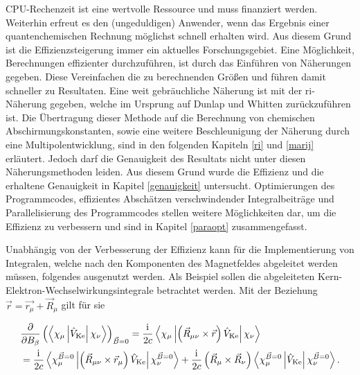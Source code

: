 CPU-Rechenzeit ist eine wertvolle Ressource und muss finanziert werden. Weiterhin erfreut es den (ungeduldigen) Anwender, wenn das Ergebnis einer quantenchemischen Rechnung möglichst schnell erhalten wird. Aus diesem Grund ist die Effizienzsteigerung immer ein aktuelles Forschungsgebiet. Eine Möglichkeit, Berechnungen effizienter durchzuführen, ist durch das Einführen von Näherungen gegeben. Diese Vereinfachen die zu berechnenden Größen und führen damit schneller zu Resultaten. Eine weit gebräuchliche Näherung ist mit der \ac{ri}-Näherung gegeben\supercite{vahtras1993integral}, welche im Ursprung auf Dunlap\supercite{dunlap1979some} und Whitten\supercite{whitten1973coulombic} zurückzuführen ist. Die Übertragung dieser Methode auf die Berechnung von chemischen Abschirmungskonstanten, sowie eine weitere Beschleunigung der Näherung durch eine Multipolentwicklung, sind in den folgenden Kapiteln \ref{ri} und \ref{marij} erläutert. Jedoch darf die Genauigkeit des Resultats nicht unter diesen Näherungsmethoden leiden. Aus diesem Grund wurde die Effizienz und die erhaltene Genauigkeit in Kapitel \ref{genauigkeit} untersucht. Optimierungen des Programmcodes, effizientes Abschätzen verschwindender Integralbeiträge und Parallelisierung des Programmcodes stellen weitere Möglichkeiten dar, um die Effizienz zu verbessern und sind in Kapitel \ref{paraopt} zusammengefasst. 

\bigskip
Unabhängig von der Verbesserung der Effizienz kann für die Implementierung von Integralen, welche nach den Komponenten des Magnetfeldes abgeleitet werden müssen, folgendes ausgenutzt werden. Als Beispiel sollen die abgeleiteten Kern-Elektron-Wechselwirkungsintegrale betrachtet werden. Mit der Beziehung $\vec{r}=\vec{r_\mu}+\vec{R}_\mu$ gilt für sie

\begin{equation}\label{eq:vmunudb}
\begin{aligned}
&\frac{\partial}{\partial B_\beta}\left(\left\langle\chi_{\mu}\left\vert\hat{V}_{\textrm{Ke}}\right\vert\chi_{\nu}\right\rangle\right)_{\vec{B}=0}=\frac{\mathrm{i}\mkern1mu}{2c}\left\langle\chi_{\mu}\left\vert\left(\vec{R}_{\mu\nu}\times\vec{r}\right)\hat{V}_{\textrm{Ke}}\right\vert\chi_{\nu}\right\rangle\\
&=\frac{\mathrm{i}\mkern1mu}{2c}\left\langle\chi_\mu^{\vec{B}=0}\left\vert\left(\vec{R}_{\mu\nu}\times\vec{r}_\mu\right)\hat{V}_{\textrm{Ke}}\right\vert\chi_\nu^{\vec{B}=0}\right\rangle+\frac{\mathrm{i}\mkern1mu}{2c}\left(\vec{R}_\mu\times\vec{R}_\nu\right)\left\langle\chi_{\mu}^{\vec{B}=0}\left\vert\hat{V}_{\textrm{Ke}}\right\vert\chi_{\nu}^{\vec{B}=0}\right\rangle.
\end{aligned}
\end{equation}

